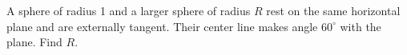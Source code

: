 A sphere of radius 1 and a larger sphere of radius $R$ rest on the same horizontal plane and are externally tangent. Their center line makes angle $60^\circ$ with the plane. Find $R$.
